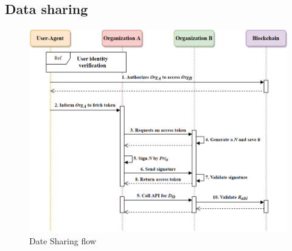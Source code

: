     \newpage
    \subsection{Data sharing}
    \begin{figure}[htb]
        \centering
        \includegraphics[height=!,width=1\linewidth,keepaspectratio=true]{figures/data_sharing.png}
        \caption{{\footnotesize Date Sharing flow}}
        \label{fig:dataSharing}
    \end{figure}

    \newpage